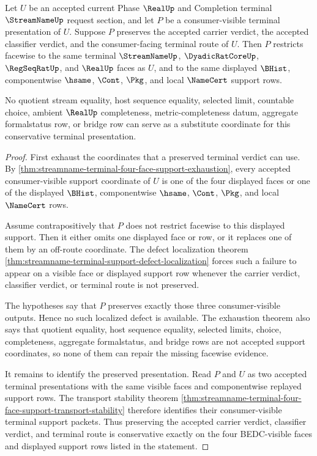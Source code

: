 \begin{theorem}
\label{thm:streamname-terminal-route-facewise-conservativity}
Let $U$ be an accepted current Phase $\RealUp$ and Completion terminal
$\StreamNameUp$ request section, and let $P$ be a consumer-visible terminal
presentation of $U$. Suppose $P$ preserves the accepted carrier verdict, the
accepted classifier verdict, and the consumer-facing terminal route of $U$.
Then $P$ restricts facewise to the same terminal $\StreamNameUp$,
$\DyadicRatCoreUp$, $\RegSeqRatUp$, and $\RealUp$ faces as $U$, and to the same
displayed $\BHist$, componentwise $\hsame$, $\Cont$, $\Pkg$, and local
$\NameCert$ support rows.

No quotient stream equality, host sequence equality, selected limit, countable
choice, ambient $\RealUp$ completeness, metric-completeness datum, aggregate
formalstatus row, or bridge row can serve as a substitute coordinate for this
conservative terminal presentation.
\end{theorem}
\begin{proof}
First exhaust the coordinates that a preserved terminal verdict can use. By
\autoref{thm:streamname-terminal-four-face-support-exhaustion}, every accepted
consumer-visible support coordinate of $U$ is one of the four displayed faces
or one of the displayed $\BHist$, componentwise $\hsame$, $\Cont$, $\Pkg$, and
local $\NameCert$ rows.

Assume contrapositively that $P$ does not restrict facewise to this displayed
support. Then it either omits one displayed face or row, or it replaces one of
them by an off-route coordinate. The defect localization theorem
\autoref{thm:streamname-terminal-support-defect-localization} forces such a
failure to appear on a visible face or displayed support row whenever the
carrier verdict, classifier verdict, or terminal route is not preserved.

The hypotheses say that $P$ preserves exactly those three consumer-visible
outputs. Hence no such localized defect is available. The exhaustion theorem
also says that quotient equality, host sequence equality, selected limits,
choice, completeness, aggregate formalstatus, and bridge rows are not accepted
support coordinates, so none of them can repair the missing facewise evidence.

It remains to identify the preserved presentation. Read $P$ and $U$ as two
accepted terminal presentations with the same visible faces and componentwise
replayed support rows. The transport stability theorem
\autoref{thm:streamname-terminal-four-face-support-transport-stability}
therefore identifies their consumer-visible terminal support packets. Thus
preserving the accepted carrier verdict, classifier verdict, and terminal route
is conservative exactly on the four BEDC-visible faces and displayed support
rows listed in the statement.
\end{proof}

